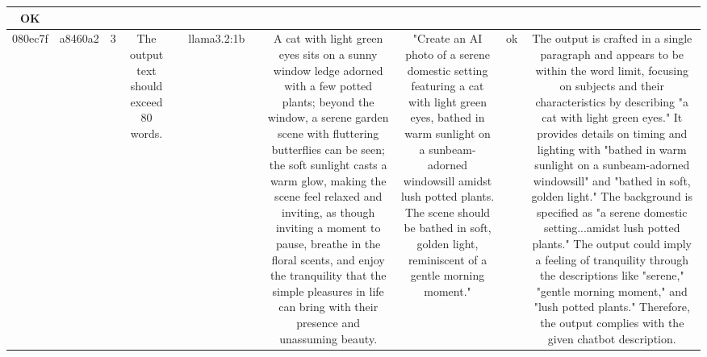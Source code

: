 \begin{table}[h!]
\begin{tabular}{|c|c|c|c|c|c|c|c|c|c|c|}
OK\\
\hline
080ec7f & a8460a2 & 3 & The output text should exceed 80 words. &  & llama3.2:1b &  & A cat with light green eyes sits on a sunny window ledge adorned with a few potted plants; beyond the window, a serene garden scene with fluttering butterflies can be seen; the soft sunlight casts a warm glow, making the scene feel relaxed and inviting, as though inviting a moment to pause, breathe in the floral scents, and enjoy the tranquility that the simple pleasures in life can bring with their presence and unassuming beauty. & "Create an AI photo of a serene domestic setting featuring a cat with light green eyes, bathed in warm sunlight on a sunbeam-adorned windowsill amidst lush potted plants. The scene should be bathed in soft, golden light, reminiscent of a gentle morning moment." & ok & The output is crafted in a single paragraph and appears to be within the word limit, focusing on subjects and their characteristics by describing "a cat with light green eyes." It provides details on timing and lighting with "bathed in warm sunlight on a sunbeam-adorned windowsill" and "bathed in soft, golden light." The background is specified as "a serene domestic setting...amidst lush potted plants." The output could imply a feeling of tranquility through the descriptions like "serene," "gentle morning moment," and "lush potted plants." Therefore, the output complies with the given chatbot description.


\end{tabular}
\end{table}

